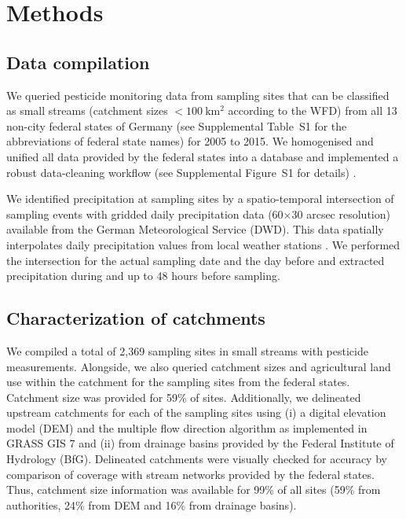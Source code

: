 \documentclass[journal=esthag,manuscript=article]{achemso}
\begin{document}
\section{Methods}
\subsection{Data compilation}
We queried pesticide monitoring data from sampling sites that can be classified as small streams (catchment sizes $\mathrm{< 100~km^2}$ according to the WFD) from all 13 non-city federal states of Germany (see Supplemental Table~S1 for the abbreviations of federal state names) for 2005 to 2015.
We homogenised and unified all data provided by the federal states into a database and implemented a robust data-cleaning workflow (see Supplemental Figure~S1 for details) \citep{poisot_best_2015}.

We identified precipitation at sampling sites by a spatio-temporal intersection of sampling events with gridded daily precipitation data (60$\times$30 arcsec resolution) available from the German Meteorological Service (DWD).
This data spatially interpolates daily precipitation values from local weather stations \citep{rauthe_central_2013}. 
We performed the intersection for the actual sampling date and the day before and extracted precipitation during and up to 48 hours before sampling. 


\subsection{Characterization of catchments}
We compiled a total of 2,369 sampling sites in small streams with pesticide measurements. %
Alongside, we also queried catchment sizes and agricultural land use within the catchment for the sampling sites from the federal states. %
Catchment size was provided for 59\% of sites. 
Additionally, we delineated upstream catchments for each of the sampling sites using (i) a digital elevation model (DEM) \citep{eea_digital_2013} and the multiple flow direction algorithm \citep{holmgren_multiple_1994} as implemented in GRASS GIS 7 \citep{neteler_grass_2012} and (ii) from drainage basins provided by the Federal Institute of Hydrology (BfG). 
Delineated catchments were visually checked for accuracy by comparison of coverage with stream networks provided by the federal states.
Thus, catchment size information was available for 99\% of all sites (59\% from authorities, 24\% from DEM and 16\% from drainage basins). 
\end{document}
